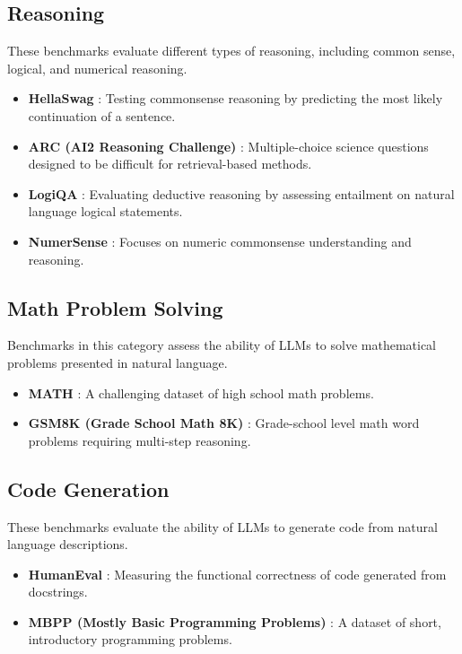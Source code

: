 \subsection{Reasoning}

These benchmarks evaluate different types of reasoning, including common sense, logical, and numerical reasoning.

\begin{itemize}
    \item \textbf{HellaSwag} \cite{zellers2019hellaswag}: Testing commonsense reasoning by predicting the most likely continuation of a sentence.
    \item \textbf{ARC (AI2 Reasoning Challenge)} \cite{clark2018think}: Multiple-choice science questions designed to be difficult for retrieval-based methods.
    \item \textbf{LogiQA} \cite{liu2020logiqa}: Evaluating deductive reasoning by assessing entailment on natural language logical statements.
    \item \textbf{NumerSense} \cite{lin2020birds}: Focuses on numeric commonsense understanding and reasoning.
\end{itemize}

\subsection{Math Problem Solving}

Benchmarks in this category assess the ability of LLMs to solve mathematical problems presented in natural language.

\begin{itemize}
    \item \textbf{MATH} \cite{hendrycks2021measuring}: A challenging dataset of high school math problems.
    \item \textbf{GSM8K (Grade School Math 8K)} \cite{cobbe2021training}: Grade-school level math word problems requiring multi-step reasoning.
\end{itemize}

\subsection{Code Generation}

These benchmarks evaluate the ability of LLMs to generate code from natural language descriptions.

\begin{itemize}
    \item \textbf{HumanEval} \cite{chen2021evaluating}: Measuring the functional correctness of code generated from docstrings.
    \item \textbf{MBPP (Mostly Basic Programming Problems)} \cite{austin2021program}: A dataset of short, introductory programming problems.
\end{itemize}

